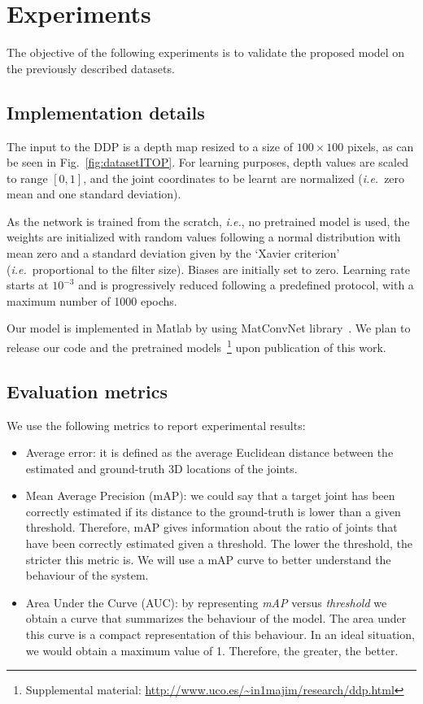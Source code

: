 \documentclass[review,12pt,3p]{elsarticle}
\def \ie{\textit{i.e.}}
\begin{document}
\section{Experiments} \label{sec:expers}
The objective of the following experiments is to validate the proposed model on the previously described datasets.


\subsection{Implementation details} \label{subsec:impldet}
The input to the DDP is a depth map resized to a size of $100 \times 100 $ pixels, as can be seen in Fig.~\ref{fig:datasetITOP}. 
For learning purposes, depth values are scaled to range $[0,1]$, and the joint coordinates to be learnt are normalized (\ie~zero mean and one standard deviation).



As the network is trained from the scratch, \ie, no pretrained model is used, the weights are initialized with random values following a normal distribution with mean zero and a standard deviation given by the `Xavier criterion' \cite{glorot2010xavier} (\ie~proportional to the filter size). Biases are initially set to zero.
Learning rate starts at $10^{-3}$ and is progressively reduced following a predefined protocol, with a maximum number of 1000 epochs. 

Our model is implemented in Matlab by using MatConvNet library~\citep{vedaldi2015matconvnet}. We plan to release our code and the pretrained models~\footnote{
Supplemental material: \url{http://www.uco.es/~in1majim/research/ddp.html}
}%
upon publication of this work. 

\subsection{Evaluation metrics} \label{subsec:metrics}
We use the following metrics to report experimental results:
\begin{itemize}
\setlength\itemsep{-0.1cm}
    \item Average error: it is defined as the average Euclidean distance between the estimated and ground-truth 3D locations of the joints. 
    \item Mean Average Precision (mAP): we could say that a target joint has been correctly estimated if its distance to the ground-truth is lower than a given threshold. Therefore, mAP gives information about the ratio of joints that have been correctly estimated given a threshold. The lower the threshold, the stricter this metric is. We will use a mAP curve to better understand the behaviour of the system.
    \item Area Under the Curve (AUC): by representing \textit{mAP} versus \textit{threshold} we obtain a curve that summarizes the behaviour of the model. The area under this curve is a compact representation of this behaviour. In an ideal situation, we would obtain a maximum value of 1. Therefore, the greater, the better. 
\end{itemize}
\end{document}
